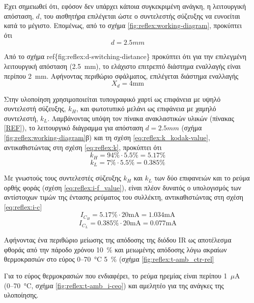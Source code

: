 Έχει σημειωθεί ότι, εφόσον δεν υπάρχει κάποια συγκεκριμένη ανάγκη, η λειτουργική
απόσταση, $d$, του αισθητήρα επιλέγεται ώστε ο συντελεστής σύζευξης να ευνοείται
κατά το μέγιστο. Επομένως, από το σχήμα \ref{fig:reflex:working-diagram},
προκύπτει ότι
\begin{equation}
d = 2.5 mm
\end{equation}

Από το σχήμα ref\{fig:reflex:d-switching-distance\} προκύπτει ότι για την
επιλεγμένη λειτουργική απόσταση (2.5~mm), το ελάχιστο επιτρεπτό διάστημα
εναλλαγής είναι περίπου 2~mm. Αφήνοντας περιθώριο σφάλματος, επιλέγεται διάστημα
εναλλαγής
\begin{equation}
X_d = 4 \text{mm}
\end{equation}

Στην υλοποίηση χρησιμοποιείται τυπογραφικό χαρτί ως επιφάνεια με υψηλό
συντελεστή σύζευξης, $k_H$, και φωτοτυπικό μελάνι ως επιφάνεια με χαμηλό
συντελεστή, $k_L$.
Λαμβάνοντας υπόψη τον πίνακα ανακλαστικών υλικών (πίνακας [\underline{REF}]), το
λειτουργικό διάγραμμα για απόσταση $d = 2.5 mm$
(σχήμα \ref{fig:reflex:working-diagram}β) και τη σχέση
\eqref{eq:reflex:k_kodak-value}, αντικαθιστώντας στη σχέση \eqref{eq:reflex:k},
προκύπτει ότι
\begin{equation}
k_H = 94 \% \cdot 5.5 \% = 5.17 \%
\end{equation}
\begin{equation}
k_L = 7 \% \cdot 5.5 \% = 0.385 \%
\end{equation}

Με γνωστούς τους συντελεστές σύζευξης $k_H$ και $k_L$ των δύο επιφανειών και το
ρεύμα ορθής φοράς (σχέση \eqref{eq:reflex:i-f_value}), είναι πλέον δυνατός ο
υπολογισμός των αντίστοιχων τιμών της έντασης ρεύματος του συλλέκτη,
αντικαθιστώντας στη σχέση \eqref{eq:reflex:i-c}
\begin{equation}
I_{C_H} = 5.17\% \cdot 20 \text{mA} = 1.034 \text{mA}
\end{equation}
\begin{equation}
I_{C_L} = 0.385\% \cdot 20 \text{mA} = 0.077 \text{mA}
\end{equation}

Αφήνοντας ένα περιθώριο μείωσης της απόδοσης της διόδου IR ως αποτέλεσμα φθοράς
από την πάροδο χρόνου 10~\% και μειωμένης απόδοσης λόγω ακραίων θερμοκρασιών
στο εύρος 0--70~°C 5~\% (σχήμα \ref{fig:reflex:t-amb_ctr-rel}

Για το εύρος θερμοκρασιών που ενδιαφέρει, το ρεύμα ηρεμίας είναι περίπου
1~$\mu$A (0--70~°C, σχήμα \ref{fig:reflex:t-amb_i-ceo}) και αμελητέο για της
ανάγκες της υλοποίησης.

